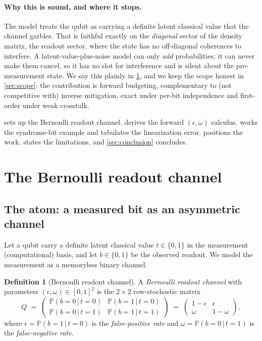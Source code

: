 \documentclass[12pt]{article}
\numberwithin{equation}{section}
\theoremstyle{plain}
\theoremstyle{definition}
\newtheorem{definition}[theorem]{Definition}
\theoremstyle{remark}
\newcommand{\eps}{\epsilon}
\newcommand{\Prob}{\mathbb{P}}
\newcommand{\given}{\,\vert\,}
\newcommand{\bits}{\{0,1\}}
\begin{document}
\paragraph{Why this is sound, and where it stops.} The model treats the qubit
as carrying a definite latent classical value that the channel garbles. That is
faithful exactly on the \emph{diagonal} sector of the density matrix, the
readout sector, where the state has no off-diagonal coherences to interfere.
A latent-value-plus-noise model can only \emph{add} probabilities; it can never
make them cancel, so it has no slot for interference and is silent about the
pre-measurement state. We say this plainly in \cref{sec:channel}, and we keep
the scope honest in \cref{sec:scope}: the contribution is forward budgeting,
complementary to (not competitive with) inverse mitigation, exact under per-bit
independence and first-order under weak crosstalk.

 sets up the Bernoulli readout channel. 
derives the forward $(\eps,\omega)$ calculus.  works the
syndrome-bit example and tabulates the linearization error. 
positions the work.  states the limitations, and
\cref{sec:conclusion} concludes.


\section{The Bernoulli readout channel}
\label{sec:channel}

\subsection{The atom: a measured bit as an asymmetric channel}

Let a qubit carry a definite latent classical value $t\in\bits$ in the
measurement (computational) basis, and let $b\in\bits$ be the observed readout.
We model the measurement as a memoryless binary channel.

\begin{definition}[Bernoulli readout channel]
\label{def:atom}
A \emph{Bernoulli readout channel} with parameters $(\eps,\omega)\in[0,1]^2$ is
the $2\times2$ row-stochastic matrix
\begin{equation}
\label{eq:channel}
  Q \;=\;
  \begin{pmatrix} \Prob(b=0\given t=0) & \Prob(b=1\given t=0) \\[2pt]
                  \Prob(b=0\given t=1) & \Prob(b=1\given t=1) \end{pmatrix}
  \;=\;
  \begin{pmatrix} 1-\eps & \eps \\[2pt] \omega & 1-\omega \end{pmatrix},
\end{equation}
where $\eps = \Prob(b=1\given t=0)$ is the \emph{false-positive rate} and
$\omega = \Prob(b=0\given t=1)$ is the \emph{false-negative rate}.
\end{definition}
\end{document}
